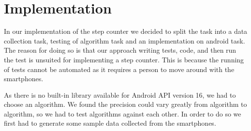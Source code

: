 \section{Implementation}
In our implementation of the step counter we decided to split the task into a data collection task, testing of algorithm task and an implementation on android task. The reason for doing so is that our approach writing tests, code, and then run the test is unsuited for implementing a step counter. This is because the running of tests cannot be automated as it requires a person to move around with the smartphones.

As there is no built-in library available for Android API version 16, we had to choose an algorithm. We found the precision could vary greatly from algorithm to algorithm, so we had to test algorithms against each other. In order to do so we first had to generate some sample data collected from the smartphones.
